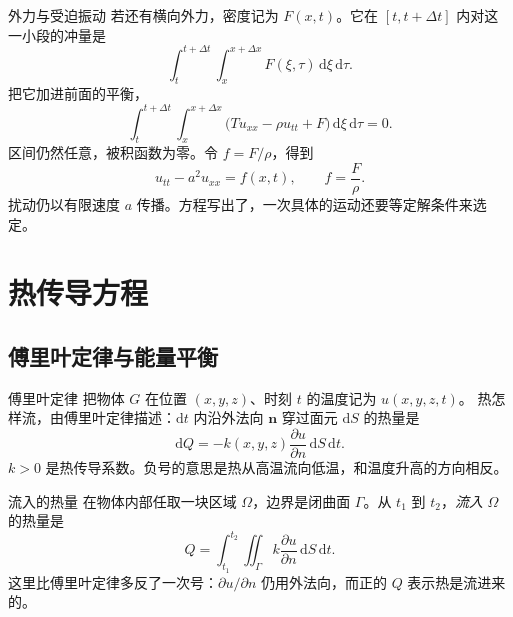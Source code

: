 \documentclass[fontset=windows, chinese, 10pt, xcolor=dvipsnames]{beamer}
\begin{document}
\begin{frame}{外力与受迫振动}
  若还有横向外力，密度记为 $F(x,t)$。它在 $[t,t+\Delta t]$ 内对这一小段的冲量是
  \begin{equation*}
    \int_t^{t+\Delta t}\int_x^{x+\Delta x} F(\xi,\tau)\,\mathrm{d}\xi\,\mathrm{d}\tau.
  \end{equation*}
  把它加进前面的平衡，
  \begin{equation*}
    \int_t^{t+\Delta t}\int_x^{x+\Delta x}
      \bigl(T u_{xx}-\rho u_{tt}+F\bigr)\,\mathrm{d}\xi\,\mathrm{d}\tau=0.
  \end{equation*}
  区间仍然任意，被积函数为零。令 $f=F/\rho$，得到
  \begin{equation*}
    \boxed{u_{tt}-a^2 u_{xx}=f(x,t),\qquad f=\dfrac{F}{\rho}.}
  \end{equation*}
  扰动仍以有限速度 $a$ 传播。方程写出了，一次具体的运动还要等定解条件来选定。
\end{frame}

\section{热传导方程}

\subsection{傅里叶定律与能量平衡}

\begin{frame}{傅里叶定律}
  把物体 $G$ 在位置 $(x,y,z)$、时刻 $t$ 的温度记为 $u(x,y,z,t)$。
  热怎样流，由傅里叶定律描述：$\mathrm{d}t$ 内沿外法向 $\mathbf{n}$ 穿过面元 $\mathrm{d}S$ 的热量是
  \begin{equation*}
    \mathrm{d}Q=-k(x,y,z)\frac{\partial u}{\partial n}\,\mathrm{d}S\,\mathrm{d}t.
  \end{equation*}
  $k>0$ 是热传导系数。负号的意思是热从高温流向低温，和温度升高的方向相反。
\end{frame}

\begin{frame}{流入的热量}
  在物体内部任取一块区域 $\Omega$，边界是闭曲面 $\Gamma$。从 $t_1$ 到 $t_2$，\emph{流入} $\Omega$ 的热量是
  \begin{equation*}
    Q=\int_{t_1}^{t_2}\iint_{\Gamma} k\frac{\partial u}{\partial n}\,\mathrm{d}S\,\mathrm{d}t.
  \end{equation*}
  这里比傅里叶定律多反了一次号：$\partial u/\partial n$ 仍用外法向，而正的 $Q$ 表示热是流进来的。
\end{frame}
\end{document}
